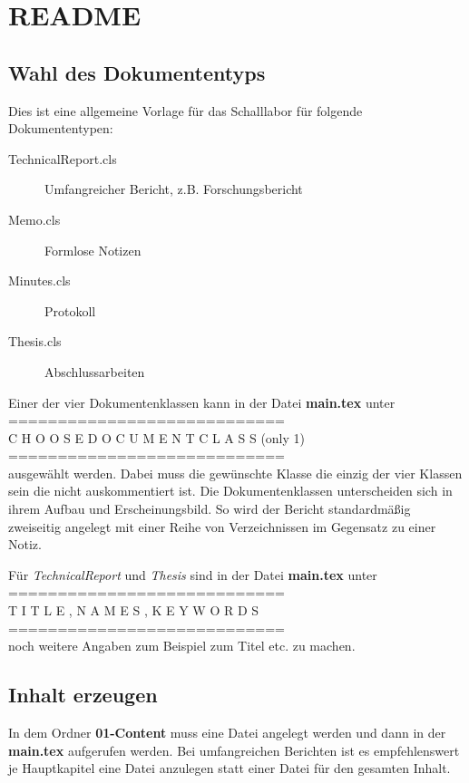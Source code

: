 
\section{README}
\subsection{Wahl des Dokumententyps}
Dies ist eine allgemeine Vorlage für das Schalllabor für folgende Dokumententypen:
\begin{description}
    \item[TechnicalReport.cls] Umfangreicher Bericht, z.B. Forschungsbericht
    \item[Memo.cls] Formlose Notizen
    \item[Minutes.cls] Protokoll
    \item[Thesis.cls] Abschlussarbeiten
\end{description}
Einer der vier Dokumentenklassen kann in der Datei \textbf{main.tex} unter\\
============================\\
C H O O S E \hspace{2em} D O C U M E N T C L A S S (only 1)\\
============================\\
ausgewählt werden. 
Dabei muss die gewünschte Klasse die einzig der vier Klassen sein die nicht auskommentiert ist.
Die Dokumentenklassen unterscheiden sich in ihrem Aufbau und Erscheinungsbild. 
So wird der Bericht standardmäßig zweiseitig angelegt mit einer Reihe von Verzeichnissen im Gegensatz zu einer Notiz.
\par 
Für \emph{TechnicalReport} und \emph{Thesis} sind in der Datei \textbf{main.tex} unter \\
============================\\
T I T L E ,  N A M E S ,  K E Y W O R D S\\
============================\\
noch weitere Angaben zum Beispiel zum Titel etc. zu machen.

\subsection{Inhalt erzeugen}
In dem Ordner \textbf{01-Content} muss eine Datei angelegt werden und dann in der \textbf{main.tex} aufgerufen werden.
Bei umfangreichen Berichten ist es empfehlenswert je Hauptkapitel eine Datei anzulegen statt einer Datei für den gesamten Inhalt. 

